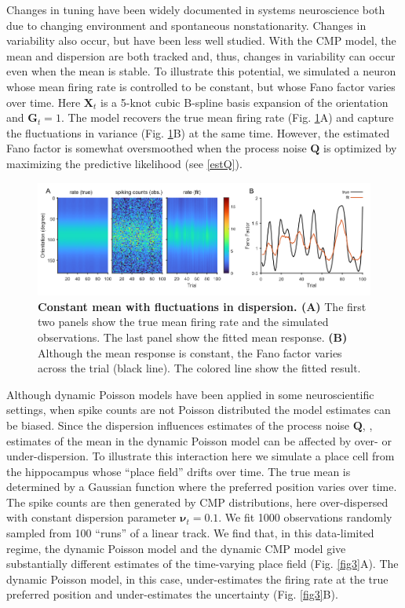 \documentclass[aoas]{imsart}
\theoremstyle{plain}
\theoremstyle{remark}
\begin{document}
Changes in tuning have been widely documented in systems neuroscience both due to changing environment and spontaneous nonstationarity. Changes in variability also occur, but have been less well studied. With the CMP model, the mean and dispersion are both tracked and, thus, changes in variability can occur even when the mean is stable. To illustrate this potential, we simulated a neuron whose mean firing rate is controlled to be constant, but whose Fano factor varies over time. Here $\bm{X}_t$ is a 5-knot cubic B-spline basis expansion of the orientation and $\bm{G}_t = 1$. The model recovers the true mean firing rate (Fig. \ref{fig2}A) and capture the fluctuations in variance (Fig. \ref{fig2}B) at the same time. However, the estimated Fano factor is somewhat oversmoothed when the process noise $\bm{Q}$ is optimized by maximizing the predictive likelihood (see \ref{estQ}).

\begin{figure}[h!]
	\centering
	\includegraphics[width=1\textwidth]{figure2.png}
	\caption{\textbf{Constant mean with fluctuations in dispersion. (A)} The first two panels show the true mean firing rate and the simulated observations. The last panel show the fitted mean response. \textbf{(B)} Although the mean response is constant, the Fano factor varies across the trial (black line). The colored line show the fitted result.}
	\label{fig2}
\end{figure}

Although dynamic Poisson models have been applied in some neuroscientific settings, when spike counts are not Poisson distributed the model estimates can be biased. Since the dispersion influences estimates of the process noise $\bm{Q}$, , estimates of the mean in the dynamic Poisson model can be affected by over- or under-dispersion. To illustrate this interaction here we simulate a place cell from the hippocampus whose “place field” drifts over time. The true mean is determined by a Gaussian function where the preferred position varies over time. The spike counts are then generated by CMP distributions, here over-dispersed with constant dispersion parameter $\bm{\nu}_t = 0.1$. We fit 1000 observations randomly sampled from 100 “runs” of a linear track. We find that, in this data-limited regime, the dynamic Poisson model and the dynamic CMP model give substantially different estimates of the time-varying place field (Fig. \ref{fig3}A). The dynamic Poisson model, in this case, under-estimates the firing rate at the true preferred position and under-estimates the uncertainty (Fig. \ref{fig3}B). 
\end{document}
